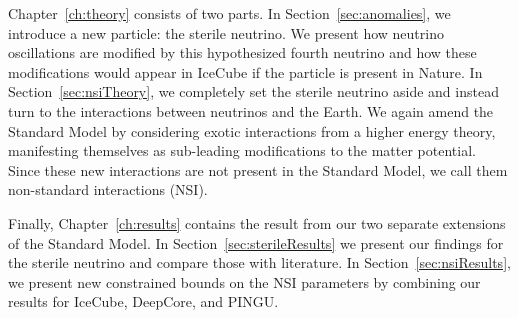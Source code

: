 Chapter~\ref{ch:theory} consists of two parts. In Section~\ref{sec:anomalies}, we introduce a new particle: the sterile neutrino. 
We present how neutrino oscillations are modified by this hypothesized fourth neutrino and how these modifications would appear in IceCube if the particle is present in Nature. 
In Section~\ref{sec:nsiTheory}, we completely set the sterile neutrino aside and instead turn to the interactions between neutrinos and the Earth. 
We again amend the Standard Model by considering exotic interactions from a higher energy theory, manifesting themselves as sub-leading modifications to the matter potential. 
Since these new interactions are not present in the Standard Model, we call them non-standard interactions (NSI). 

Finally, Chapter~\ref{ch:results} contains the result from our two separate extensions of the Standard Model.
In Section~\ref{sec:sterileResults} we present our findings for the sterile neutrino and compare those with literature. 
In Section~\ref{sec:nsiResults}, we present new constrained bounds on the NSI parameters by combining our results for IceCube, DeepCore, and PINGU.